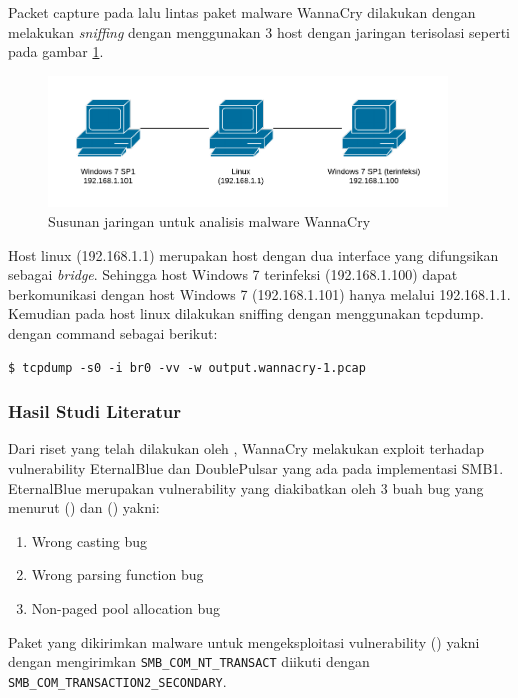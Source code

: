 Packet capture pada lalu lintas paket malware WannaCry dilakukan dengan melakukan \textit{sniffing} dengan menggunakan 3 host dengan jaringan terisolasi seperti pada gambar \ref{fig:analisis_malware_net}.

\begin{figure}[H]
	\centering
	\includegraphics[width=400px]{resources/analisis_malware_net.png}
	\caption{Susunan jaringan untuk analisis malware WannaCry}
	\label{fig:analisis_malware_net}
\end{figure}

Host linux (192.168.1.1) merupakan host dengan dua interface yang difungsikan sebagai \textit{bridge}. Sehingga host Windows 7 terinfeksi (192.168.1.100) dapat berkomunikasi dengan host Windows 7 (192.168.1.101) hanya melalui 192.168.1.1. Kemudian pada host linux dilakukan sniffing dengan menggunakan tcpdump. dengan command sebagai berikut:

\begin{verbatim}
$ tcpdump -s0 -i br0 -vv -w output.wannacry-1.pcap
\end{verbatim}

\subsubsection{Hasil Studi Literatur}

Dari riset yang telah dilakukan oleh \cite{islam2018smb}, WannaCry melakukan exploit terhadap vulnerability EternalBlue dan DoublePulsar yang ada pada implementasi SMB1. EternalBlue merupakan vulnerability yang diakibatkan oleh 3 buah bug yang menurut (\cite{islam2018smb}) dan (\cite{grossman2017check}) yakni:
\begin{enumerate}
	\item Wrong casting bug
	\item Wrong parsing function bug
	\item Non-paged pool allocation bug
\end{enumerate}

Paket yang dikirimkan malware untuk mengeksploitasi vulnerability (\cite{islam2018smb}) yakni dengan mengirimkan \verb|SMB_COM_NT_TRANSACT|  diikuti dengan \verb|SMB_COM_TRANSACTION2_SECONDARY|.

